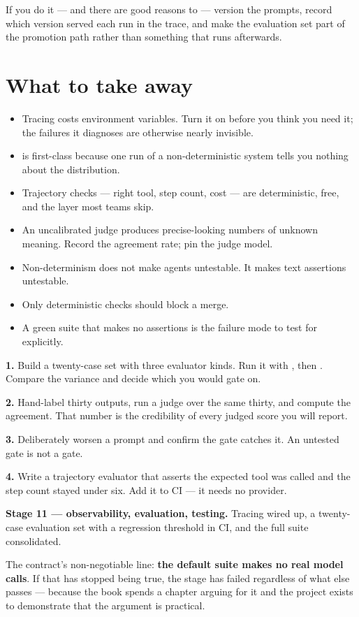 If you do it --- and there are good reasons to --- version the prompts, record
which version served each run in the trace, and make the evaluation set part of
the promotion path rather than something that runs afterwards.

\section{What to take away}
\label{sec:ch14-summary}

\begin{itemize}[leftmargin=1.4em]
\item Tracing costs environment variables. Turn it on before you think you need
      it; the failures it diagnoses are otherwise nearly invisible.
\item {} is first-class because one run of a
      non-deterministic system tells you nothing about the distribution.
\item Trajectory checks --- right tool, step count, cost --- are deterministic,
      free, and the layer most teams skip.
\item An uncalibrated judge produces precise-looking numbers of unknown meaning.
      Record the agreement rate; pin the judge model.
\item Non-determinism does not make agents untestable. It makes text assertions
      untestable.
\item Only deterministic checks should block a merge.
\item A green suite that makes no assertions is the failure mode to test for
      explicitly.
\end{itemize}

\begin{exercisebox}
\textbf{1.} Build a twenty-case set with three evaluator kinds. Run it with
, then . Compare the variance and decide which
you would gate on.

\textbf{2.} Hand-label thirty outputs, run a judge over the same thirty, and
compute the agreement. That number is the credibility of every judged score you
will report.

\textbf{3.} Deliberately worsen a prompt and confirm the gate catches it. An
untested gate is not a gate.

\textbf{4.} Write a trajectory evaluator that asserts the expected tool was
called and the step count stayed under six. Add it to CI --- it needs no
provider.
\end{exercisebox}

\begin{projectbox}
\textbf{Stage 11 --- observability, evaluation, testing.} Tracing wired up, a
twenty-case evaluation set with a regression threshold in CI, and the full suite
consolidated.

The contract's non-negotiable line: \textbf{the default suite makes no real model
calls}. If that has stopped being true, the stage has failed regardless of what
else passes --- because the book spends a chapter arguing for it and the project
exists to demonstrate that the argument is practical.
\end{projectbox}
